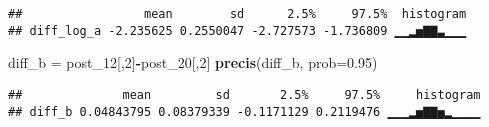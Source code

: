 \documentclass[
]{article}
\newenvironment{Shaded}{\begin{snugshade}}{\end{snugshade}}
\newcommand{\AttributeTok}[1]{\textcolor[rgb]{0.13,0.29,0.53}{#1}}
\newcommand{\DecValTok}[1]{\textcolor[rgb]{0.00,0.00,0.81}{#1}}
\newcommand{\FloatTok}[1]{\textcolor[rgb]{0.00,0.00,0.81}{#1}}
\newcommand{\FunctionTok}[1]{\textcolor[rgb]{0.13,0.29,0.53}{\textbf{#1}}}
\newcommand{\NormalTok}[1]{#1}
\newcommand{\OtherTok}[1]{\textcolor[rgb]{0.56,0.35,0.01}{#1}}
\newcommand{\SpecialCharTok}[1]{\textcolor[rgb]{0.81,0.36,0.00}{\textbf{#1}}}
\begin{document}
\begin{verbatim}
##                 mean        sd      2.5%     97.5%  histogram
## diff_log_a -2.235625 0.2550047 -2.727573 -1.736809 ▁▁▂▅▇▇▃▁▁▁
\end{verbatim}

\begin{Shaded}
\begin{Highlighting}[]
\NormalTok{diff\_b }\OtherTok{=}\NormalTok{ post\_12[,}\DecValTok{2}\NormalTok{]}\SpecialCharTok{{-}}\NormalTok{post\_20[,}\DecValTok{2}\NormalTok{]}
\FunctionTok{precis}\NormalTok{(diff\_b, }\AttributeTok{prob=}\FloatTok{0.95}\NormalTok{)}
\end{Highlighting}
\end{Shaded}

\begin{verbatim}
##              mean         sd       2.5%     97.5%     histogram
## diff_b 0.04843795 0.08379339 -0.1171129 0.2119476 ▁▁▁▂▅▇▇▅▂▁▁▁▁
\end{verbatim}
\end{document}
